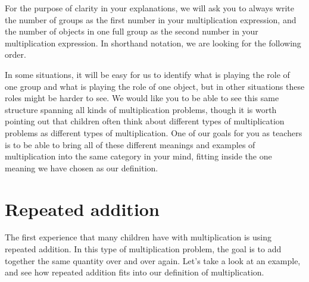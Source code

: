 \documentclass{ximera}
\begin{document}
For the purpose of clarity in your explanations, we will ask you to always write the number of groups as the first number in your multiplication expression, and the number of objects in one full group as the second number in your multiplication expression. In shorthand notation, we are looking for the following order.
\begin{image}
\end{image}

In some situations, it will be easy for us to identify what is playing the role of one group and what is playing the role of one object, but in other situations these roles might be harder to see. We would like you to be able to see this same structure spanning all kinds of multiplication problems, though it is worth pointing out that children often think about different types of multiplication problems as different types of multiplication. One of our goals for you as teachers is to be able to bring all of these different meanings and examples of multiplication into the same category in your mind, fitting inside the one meaning we have chosen as our definition.



\section{Repeated addition}

The first experience that many children have with multiplication is using repeated addition. In this type of multiplication problem, the goal is to add together the same quantity over and over again. Let's take a look at an example, and see how repeated addition fits into our definition of multiplication.
\end{document}

